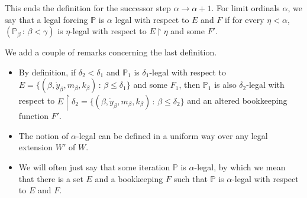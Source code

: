 \documentclass[a4paper,11pt]{article}
\newcommand{\forceP}{\mathbb{P}}
\begin{document}
This ends the definition for the successor step $\alpha \rightarrow \alpha+1$.
For limit ordinals $\alpha$, we say that a legal forcing $\forceP$ is $\alpha$ legal with respect to $E$ and $F$ if for every $\eta < \alpha$,
$(\forceP_{\beta} \,: \, \beta < \gamma)$ is $\eta$-legal with respect to $E \upharpoonright \eta$ and some $F'$.
\par \medskip

We add a couple of remarks concerning the last definition.
\begin{itemize}

\item By definition, if $\delta_2 < \delta_1$ and $\forceP_1$ is $\delta_1$-legal with respect to $E= \{(\beta, \dot{y}_{\beta}, m_{\beta} ,k_{\beta}) \, : \,  \beta \le \delta_1\}$ and some $F_1$, then  $\forceP_1$ is also $\delta_2$-legal with respect to $E \upharpoonright \delta_2 = \{(\beta, \dot{y}_{\beta}, m_{\beta} ,k_{\beta}) \, : \,  \beta \le \delta_2\}$ and an altered bookkeeping function $F'$.
 
\item The notion of $\alpha$-legal can be defined in a uniform way over any legal extension $W'$ of $W$.

\item We will often just say that some iteration $\forceP$ is $\alpha$-legal, by which we mean that there is a set $E$ and a bookkeeping $F$ such that $\forceP $ is $\alpha$-legal with respect to $E$ and $F$.
\end{itemize}
\end{document}
